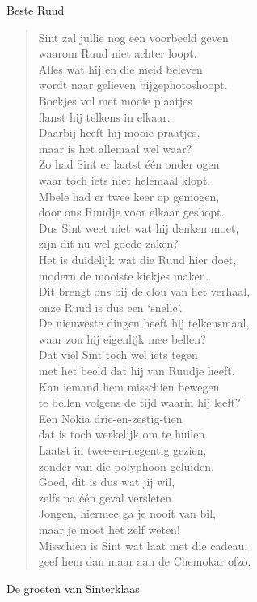 \documentclass[12pt]{brief}
\begin{document}
\begin{letter}{Beste Ruud}
\begin{verse}
Sint zal jullie nog een voorbeeld geven\\
waarom Ruud niet achter loopt.\\
Alles wat hij en die meid beleven\\
wordt naar gelieven bijgephotoshoopt.\\[1.5em]

Boekjes vol met mooie plaatjes\\
flanst hij telkens in elkaar.\\
Daarbij heeft hij mooie praatjes,\\
maar is het allemaal wel waar?\\[1.5em]

Zo had Sint er laatst \'e\'en onder ogen\\
waar toch iets niet helemaal klopt.\\
Mbele had er twee keer op gemogen,\\
door ons Ruudje voor elkaar geshopt.\\[1.5em]

Dus Sint weet niet wat hij denken moet,\\
zijn dit nu wel goede zaken?\\
Het is duidelijk wat die Ruud hier doet,\\
modern de mooiste kiekjes maken.\\[1.5em]

Dit brengt ons bij de clou van het verhaal,\\
onze Ruud is dus een `snelle'.\\
De nieuweste dingen heeft hij telkensmaal,\\
waar zou hij eigenlijk mee bellen?\\[1.5em]

Dat viel Sint toch wel iets tegen\\
met het beeld dat hij van Ruudje heeft.\\
Kan iemand hem misschien bewegen\\
te bellen volgens de tijd waarin hij leeft?\\[1.5em]

Een Nokia drie-en-zestig-tien\\
dat is toch werkelijk om te huilen.\\
Laatst in twee-en-negentig gezien,\\
zonder van die polyphoon geluiden.\\[1.5em]

Goed, dit is dus wat jij wil,\\
zelfs na \'e\'en geval versleten.\\
Jongen, hiermee ga je nooit van bil,\\
maar je moet het zelf weten!\\[1.5em]

Misschien is Sint wat laat met die cadeau,\\
geef hem dan maar aan de Chemokar ofzo.\\[1.5em]

\end{verse}


De groeten van Sinterklaas


\closing{}

\end{letter}
\end{document}
